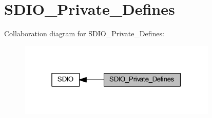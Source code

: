 \hypertarget{group___s_d_i_o___private___defines}{}\section{S\+D\+I\+O\+\_\+\+Private\+\_\+\+Defines}
\label{group___s_d_i_o___private___defines}
Collaboration diagram for S\+D\+I\+O\+\_\+\+Private\+\_\+\+Defines\+:
\nopagebreak
\begin{figure}[H]
\begin{center}
\leavevmode
\includegraphics[width=268pt]{group___s_d_i_o___private___defines}
\end{center}
\end{figure}
